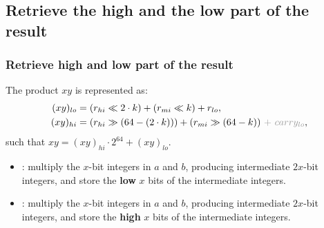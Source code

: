 \documentclass[10pt]{beamer}
\begin{document}
\subsection{Retrieve the high and the low part of the result}
\begin{frame}
    \frametitle{Retrieve high and low part of the result}
    \begin{mybox}
        The product $xy$ is represented as:
        \begin{align*}
            (xy)_{lo} &= (r_{hi} \ll 2\cdot k) + (r_{mi} \ll k) + r_{lo}, \\
            (xy)_{hi} &= (r_{hi} \gg (64 - (2\cdot k))) + (r_{mi} \gg (64 - k)) \textcolor{white!60!black}{\ +\ carry_{lo}},
        \end{align*}
        such that $xy = (xy)_{hi}\cdot 2^{64} + (xy)_{lo}$.
    \end{mybox}

    \pause
    \begin{itemize}
        \item {}: multiply the $x$-bit integers in $a$ and $b$, producing intermediate $2x$-bit integers, 
        and store the \textbf{low} $x$ bits of the intermediate integers.
        \item {}: multiply the $x$-bit integers in $a$ and $b$, producing intermediate $2x$-bit integers, 
        and store the \textbf{high} $x$ bits of the intermediate integers.
    \end{itemize}



\end{frame}
\end{document}

